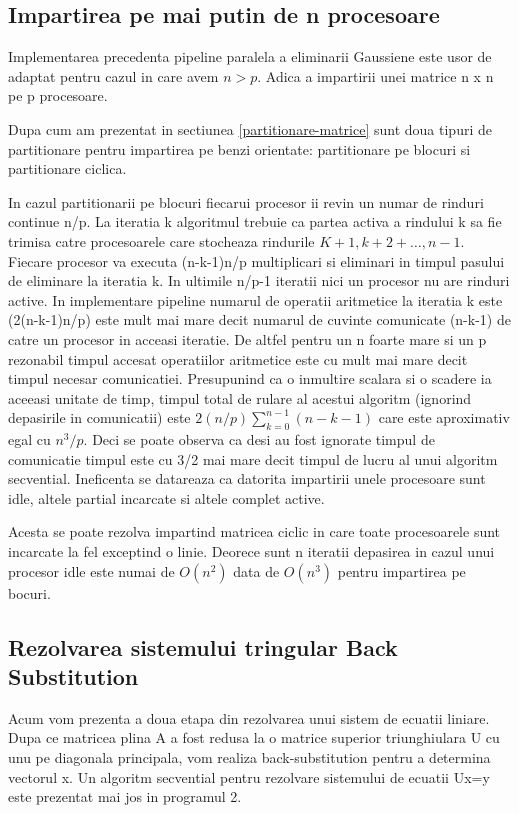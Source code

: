 \subsection{Impartirea pe mai putin de n procesoare}

\label{algoritm}
\hspace{5mm}Implementarea precedenta pipeline paralela a eliminarii Gaussiene 
este usor de adaptat pentru cazul in care avem $n>p$. Adica a impartirii
unei matrice n x n pe p procesoare.

Dupa cum am prezentat in sectiunea \ref{partitionare-matrice} sunt doua
tipuri de partitionare pentru impartirea pe benzi orientate: partitionare pe 
blocuri si partitionare ciclica.

In cazul partitionarii pe blocuri fiecarui procesor ii revin un numar de
rinduri continue n/p. La iteratia k algoritmul trebuie ca partea activa a
rindului k sa fie trimisa catre procesoarele care stocheaza rindurile
$K+1,k+2+\ldots,n-1$. Fiecare procesor va executa (n-k-1)n/p multiplicari si
eliminari in timpul pasului de eliminare la iteratia k. In ultimile n/p-1
iteratii nici un procesor nu are rinduri active. In implementare pipeline
numarul de operatii aritmetice la iteratia k este (2(n-k-1)n/p) este mult
mai mare decit numarul de cuvinte comunicate (n-k-1) de catre un procesor in
acceasi iteratie. De altfel pentru un n foarte mare si un p rezonabil
timpul accesat operatiilor aritmetice este cu mult mai mare decit timpul
necesar comunicatiei. Presupunind ca o inmultire scalara si o scadere ia
aceeasi unitate de timp, timpul total de rulare al acestui algoritm
(ignorind depasirile in comunicatii) este $2(n/p)\sum_{k=0}^{n-1}(n-k-1)$
care este aproximativ egal cu $n^3/p$. Deci se poate observa ca desi au fost
ignorate timpul de comunicatie timpul este cu 3/2 mai mare decit timpul de
lucru al unui algoritm secvential. Ineficenta se datareaza ca datorita
impartirii unele procesoare sunt idle, altele partial incarcate si altele
complet active.

Acesta se poate rezolva impartind matricea ciclic in care toate procesoarele
sunt incarcate la fel exceptind o linie. Deorece sunt n iteratii depasirea
in cazul unui procesor idle este numai de $O(n^2)$ data de $O(n^3)$ pentru
impartirea pe bocuri.
\subsection{Rezolvarea sistemului tringular {\bf Back Substitution}}

\label{substitutie}
\hspace{5mm}Acum vom prezenta a doua etapa din rezolvarea unui sistem de
ecuatii liniare. Dupa ce matricea plina A a fost redusa la o matrice
superior triunghiulara U cu unu pe diagonala principala, vom realiza
back-substitution pentru a determina vectorul x. Un algoritm secvential
pentru rezolvare sistemului de ecuatii Ux=y este prezentat mai jos in
programul 2.

